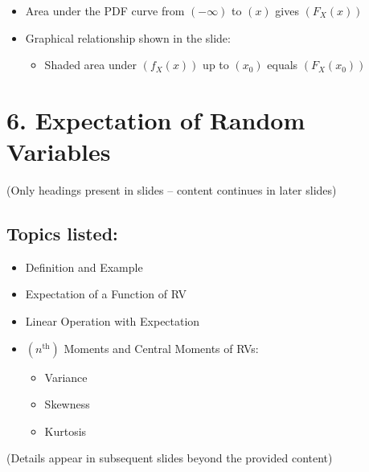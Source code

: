 \documentclass[12pt]{article}
\begin{document}
\begin{itemize}
\item Area under the PDF curve from $(-\infty)$ to $(x)$ gives $(F_X(x))$
\item Graphical relationship shown in the slide:
\begin{itemize}
\item Shaded area under $(f_X(x))$ up to $(x_0)$ equals $(F_X(x_0))$
\end{itemize}
\end{itemize}

\section*{6. Expectation of Random Variables}

(Only headings present in slides -- content continues in later slides)

\subsection*{Topics listed:}

\begin{itemize}
\item Definition and Example
\item Expectation of a Function of RV
\item Linear Operation with Expectation
\item $(n^{\text{th}})$ Moments and Central Moments of RVs:
\begin{itemize}
\item Variance
\item Skewness
\item Kurtosis
\end{itemize}
\end{itemize}

(Details appear in subsequent slides beyond the provided content)
\end{document}
